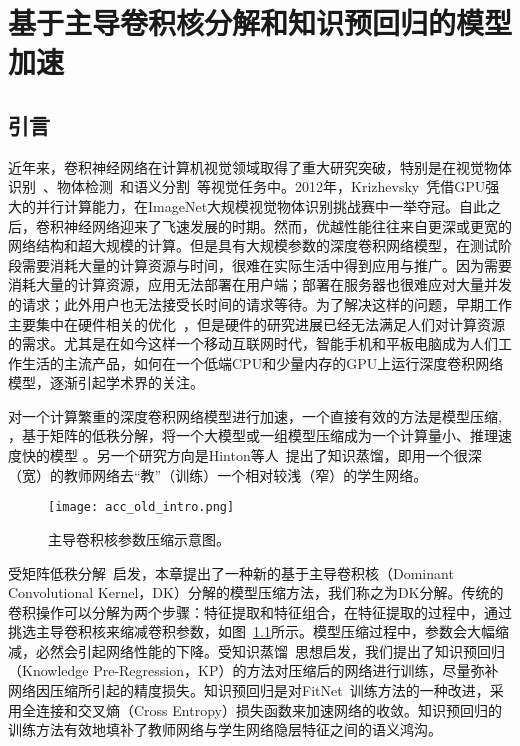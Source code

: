 \chapter{基于主导卷积核分解和知识预回归的模型加速}
\label{cha:acc}

\section{引言}
\label{sec:acc:introduction}

近年来，卷积神经网络在计算机视觉领域取得了重大研究突破，特别是在视觉物体识别~\cite{krizhevsky2012imagenet}、物体检测~\cite{girshick2014rich}和语义分割~\cite{sermanet2013overfeat}等视觉任务中。2012年，Krizhevsky~\cite{krizhevsky2012imagenet}凭借GPU强大的并行计算能力，在ImageNet大规模视觉物体识别挑战赛中一举夺冠。自此之后，卷积神经网络迎来了飞速发展的时期。然而，优越性能往往来自更深或更宽的网络结构和超大规模的计算。但是具有大规模参数的深度卷积网络模型，在测试阶段需要消耗大量的计算资源与时间，很难在实际生活中得到应用与推广。因为需要消耗大量的计算资源，应用无法部署在用户端；部署在服务器也很难应对大量并发的请求；此外用户也无法接受长时间的请求等待。为了解决这样的问题，早期工作主要集中在硬件相关的优化~\cite{vanhoucke2011improving,farabet2011large,krizhevsky2014one,krizhevsky2012imagenet,jia2014caffe}，但是硬件的研究进展已经无法满足人们对计算资源的需求。尤其是在如今这样一个移动互联网时代，智能手机和平板电脑成为人们工作生活的主流产品，如何在一个低端CPU和少量内存的GPU上运行深度卷积网络模型，逐渐引起学术界的关注。

对一个计算繁重的深度卷积网络模型进行加速，一个直接有效的方法是模型压缩\cite{denil2013predicting,jaderberg2014speeding,denton2014exploiting,lebedev2014speeding,zhang2015efficient}, \cite{jaderberg2014speeding}，基于矩阵的低秩分解，将一个大模型或一组模型压缩成为一个计算量小、推理速度快的模型 。另一个研究方向是Hinton等人~\cite{hinton2015distilling}提出了知识蒸馏，即用一个很深（宽）的教师网络去“教”（训练）一个相对较浅（窄）的学生网络\cite{hinton2015distilling,bucilu2006model,ba2014deep,romero2014fitnets}。

\begin{figure}[t]
\centering
\texttt{[image: acc\_old\_intro.png]}
\caption{主导卷积核参数压缩示意图。}
\label{fig:acc_old_intro}
\end{figure} 

受矩阵低秩分解~\cite{zhang2015efficient}启发，本章提出了一种新的基于主导卷积核（Dominant Convolutional Kernel，DK）分解的模型压缩方法，我们称之为DK分解。传统的卷积操作可以分解为两个步骤：特征提取和特征组合，在特征提取的过程中，通过挑选主导卷积核来缩减卷积参数，如图~\ref{fig:acc_old_intro}所示。模型压缩过程中，参数会大幅缩减，必然会引起网络性能的下降。受知识蒸馏~\cite{hinton2015distilling}思想启发，我们提出了知识预回归（Knowledge Pre-Regression，KP）的方法对压缩后的网络进行训练，尽量弥补网络因压缩所引起的精度损失。知识预回归是对FitNet~\cite{romero2014fitnets}训练方法的一种改进，采用全连接和交叉熵（Cross Entropy）损失函数来加速网络的收敛。知识预回归的训练方法有效地填补了教师网络与学生网络隐层特征之间的语义鸿沟。

